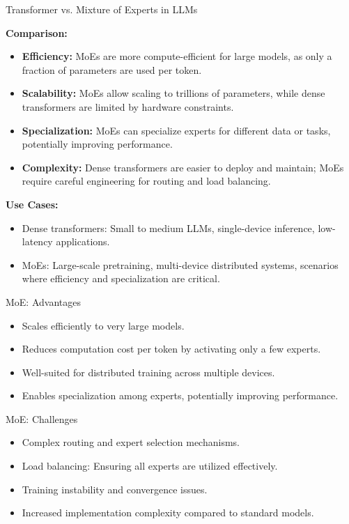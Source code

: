 \begin{frame}[allowframebreaks]{Transformer vs. Mixture of Experts in LLMs}
\framebreak

    \textbf{Comparison:}
    \begin{itemize}
        \item \textbf{Efficiency:} MoEs are more compute-efficient for large models, as only a fraction of parameters are used per token.
        \item \textbf{Scalability:} MoEs allow scaling to trillions of parameters, while dense transformers are limited by hardware constraints.
        \item \textbf{Specialization:} MoEs can specialize experts for different data or tasks, potentially improving performance.
        \item \textbf{Complexity:} Dense transformers are easier to deploy and maintain; MoEs require careful engineering for routing and load balancing.
    \end{itemize}

\framebreak

    \textbf{Use Cases:}
    \begin{itemize}
        \item Dense transformers: Small to medium LLMs, single-device inference, low-latency applications.
        \item MoEs: Large-scale pretraining, multi-device distributed systems, scenarios where efficiency and specialization are critical.
    \end{itemize}
\end{frame}

\begin{frame}{MoE: Advantages}
    \begin{itemize}
        \item Scales efficiently to very large models.
        \item Reduces computation cost per token by activating only a few experts.
        \item Well-suited for distributed training across multiple devices.
        \item Enables specialization among experts, potentially improving performance.
    \end{itemize}
\end{frame}

\begin{frame}{MoE: Challenges}
    \begin{itemize}
        \item Complex routing and expert selection mechanisms.
        \item Load balancing: Ensuring all experts are utilized effectively.
        \item Training instability and convergence issues.
        \item Increased implementation complexity compared to standard models.
    \end{itemize}
\end{frame}